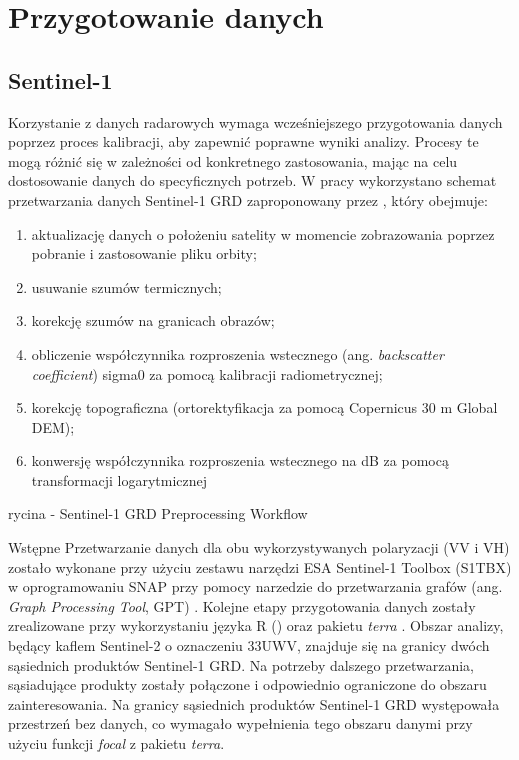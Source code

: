 \documentclass{amuthesis}
\begin{document}
\hypertarget{sec-processing}{%
\section{Przygotowanie danych}\label{sec-processing}}

\hypertarget{sec-processing-s1}{%
\subsection{Sentinel-1}\label{sec-processing-s1}}

Korzystanie z danych radarowych wymaga wcześniejszego przygotowania
danych poprzez proces kalibracji, aby zapewnić poprawne wyniki analizy.
Procesy te mogą różnić się w zależności od konkretnego zastosowania,
mając na celu dostosowanie danych do specyficznych potrzeb. W pracy
wykorzystano schemat przetwarzania danych Sentinel-1 GRD zaproponowany
przez \textcite{filipponi_2019_s1_workflow}, który obejmuje:

\begin{enumerate}
\def\labelenumi{\arabic{enumi}.}
\item
  aktualizację danych o położeniu satelity w momencie zobrazowania
  poprzez pobranie i zastosowanie pliku orbity;
\item
  usuwanie szumów termicznych;
\item
  korekcję szumów na granicach obrazów;
\item
  obliczenie współczynnika rozproszenia wstecznego (ang.
  \emph{backscatter coefficient}) sigma0 za pomocą kalibracji
  radiometrycznej;
\item
  korekcję topograficzna (ortorektyfikacja za pomocą Copernicus 30 m
  Global DEM);
\item
  konwersję współczynnika rozproszenia wstecznego na dB za pomocą
  transformacji logarytmicznej
\end{enumerate}

rycina - Sentinel-1 GRD Preprocessing Workflow

Wstępne Przetwarzanie danych dla obu wykorzystywanych polaryzacji (VV i
VH) zostało wykonane przy użyciu zestawu narzędzi ESA Sentinel-1 Toolbox
(S1TBX) \autocite{s1tbx} w oprogramowaniu SNAP \autocite{snap} przy
pomocy narzedzie do przetwarzania grafów (ang. \emph{Graph Processing
Tool}, GPT) . Kolejne etapy przygotowania danych zostały zrealizowane
przy wykorzystaniu języka R (\textcite{R-base}) oraz pakietu
\emph{terra} \autocite{R-terra}. Obszar analizy, będący kaflem
Sentinel-2 o oznaczeniu 33UWV, znajduje się na granicy dwóch sąsiednich
produktów Sentinel-1 GRD. Na potrzeby dalszego przetwarzania,
sąsiadujące produkty zostały połączone i odpowiednio ograniczone do
obszaru zainteresowania. Na granicy sąsiednich produktów Sentinel-1 GRD
występowała przestrzeń bez danych, co wymagało wypełnienia tego obszaru
danymi przy użyciu funkcji \emph{focal} z pakietu \emph{terra}.
\end{document}
